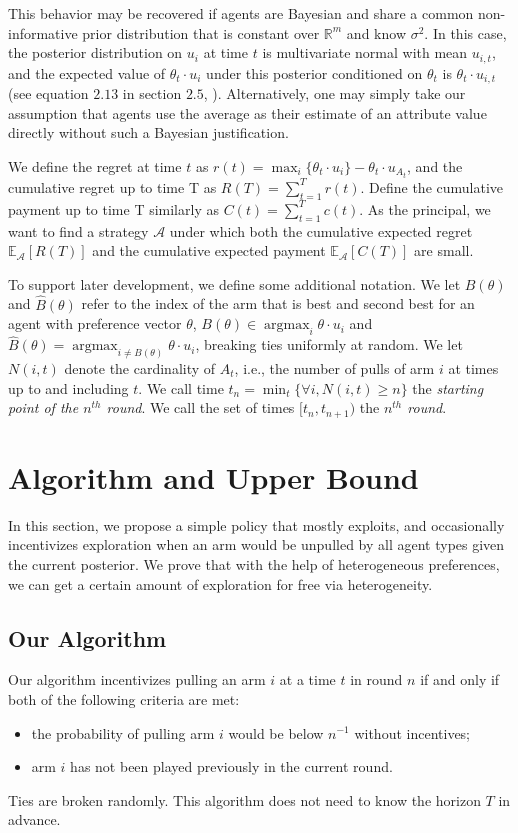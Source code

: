 \documentclass{article}
\newcommand{\argmax}{\mathop{\mathrm{argmax}}}
\begin{document}
This behavior may be recovered if agents are Bayesian and share a common non-informative prior distribution that is constant over $\mathbb{R}^m$ and know $\sigma^2$.  In this case, the posterior distribution on $u_{i}$ at time $t$ is multivariate normal with mean $u_{i,t}$, and the expected value of $\theta_t \cdot u_i$ under this posterior conditioned on $\theta_t$ is $\theta_t \cdot u_{i,t}$ (see equation $2.13$ in section $2.5$, \cite{Ge04}).  Alternatively, one may simply take our assumption that agents use the average as their estimate of an attribute value directly without such a Bayesian justification.

We define the regret at time $t$ as $r(t)=\max_{i}\{\theta_{t}\cdot u_{i}\}-\theta_t\cdot u_{A_t}$, and the cumulative regret up to time T as $R(T)=\sum_{t=1}^{T}r(t)$. Define the cumulative payment up to time T similarly as $C(t)=\sum_{t=1}^{T}c(t)$. 
As the principal, we want to find a strategy $\mathcal{A}$ under which both the cumulative expected regret $\mathbb{E}_{\mathcal{A}}[R(T)]$ and the cumulative expected payment $\mathbb{E}_{\mathcal{A}}[C(T)]$ are small.

To support later development, we define some additional notation.
We let $B(\theta)$ and $\hat{B}(\theta)$ refer to the index of the arm that is best and second best for an agent with preference vector $\theta$, $B(\theta) \in \argmax_i \theta \cdot u_i$ and $\hat{B}(\theta)=\argmax_{i\neq B(\theta)}\theta\cdot u_{i}$, breaking ties uniformly at random. We let $N(i,t)$ denote the cardinality of $A_t$, i.e., the number of pulls of arm $i$ at times up to and including $t$.
We call time $t_{n}=\min_{t}\{\forall i, N(i,t)\geq n\}$ the {\it starting point of the $n^{th}$ round}. We call the set of times $[t_{n}, t_{n+1})$ the {\it $n^{th}$ round}.


\section{Algorithm and Upper Bound}
\label{sec:ub}

In this section, we propose a simple policy that mostly exploits, and occasionally incentivizes exploration when an arm would be unpulled by all agent types given the current posterior. We prove that with the help of heterogeneous preferences, we can get a certain amount of exploration for free via heterogeneity. 

\subsection{Our Algorithm}
Our algorithm incentivizes pulling an arm $i$ at a time $t$ in round $n$ if and only if both of the following criteria are met:
\begin{itemize}
\item the probability of pulling arm $i$ would be below $n^{-1}$ without incentives; 
\item arm $i$ has not been played previously in the current round.
\end{itemize}
Ties are broken randomly.  This algorithm does not need to know the horizon $T$ in advance. 
\end{document}
